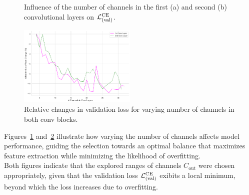 \begin{figure}[H]
    \centering
    \caption{Influence of the number of channels in the first (a) and second (b) convolutional layers on \( \mathcal{L}_{(\text{val})}^{\text{CE}} \).}
    \label{fig:ch1ch2}
\end{figure}

\begin{figure}[H]
    \centering
    \includegraphics[width=0.5\textwidth]{figures/06_ModelExploration/4_CNN/conv_ch_change.png}
    \caption{Relative changes in validation loss for varying number of channels in both conv blocks.}
    \label{fig:ch1ch2_relchange}
\end{figure}

Figures~\ref{fig:ch1ch2} and~\ref{fig:ch1ch2_relchange} illustrate how varying the number of channels affects model
performance, guiding the selection towards an optimal balance that maximizes feature extraction while minimizing the
likelihood of overfitting.\\
Both figures indicate that the explored ranges of channels \( C_{\text{out}} \) were chosen appropriately, given that
the validation loss \( \mathcal{L}_{(\text{val})}^{\text{CE}} \) exibits a local minimum, beyond which the loss increases due to overfitting. \\

